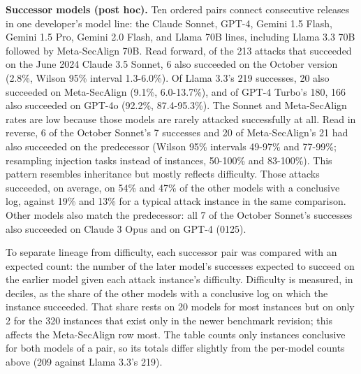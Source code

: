 \documentclass[
  american,
  10pt,
  a4paper,
]{article}
\begin{document}
\textbf{Successor models (post hoc).} Ten ordered pairs connect
consecutive releases in one developer's model line: the Claude Sonnet,
GPT-4, Gemini 1.5 Flash, Gemini 1.5 Pro, Gemini 2.0 Flash, and Llama 70B
lines, including Llama 3.3 70B followed by Meta-SecAlign 70B. Read
forward, of the 213 attacks that succeeded on the June 2024 Claude 3.5
Sonnet, 6 also succeeded on the October version (2.8\%, Wilson 95\%
interval 1.3-6.0\%). Of Llama 3.3's 219 successes, 20 also succeeded on
Meta-SecAlign (9.1\%, 6.0-13.7\%), and of GPT-4 Turbo's 180, 166 also
succeeded on GPT-4o (92.2\%, 87.4-95.3\%). The Sonnet and Meta-SecAlign
rates are low because those models are rarely attacked successfully at
all. Read in reverse, 6 of the October Sonnet's 7 successes and 20 of
Meta-SecAlign's 21 had also succeeded on the predecessor (Wilson 95\%
intervals 49-97\% and 77-99\%; resampling injection tasks instead of
instances, 50-100\% and 83-100\%). This pattern resembles inheritance
but mostly reflects difficulty. Those attacks succeeded, on average, on
54\% and 47\% of the other models with a conclusive log, against 19\%
and 13\% for a typical attack instance in the same comparison. Other
models also match the predecessor: all 7 of the October Sonnet's
successes also succeeded on Claude 3 Opus and on GPT-4 (0125).

To separate lineage from difficulty, each successor pair was compared
with an expected count: the number of the later model's successes
expected to succeed on the earlier model given each attack instance's
difficulty. Difficulty is measured, in deciles, as the share of the
other models with a conclusive log on which the instance succeeded. That
share rests on 20 models for most instances but on only 2 for the 320
instances that exist only in the newer benchmark revision; this affects
the Meta-SecAlign row most. The table counts only instances conclusive
for both models of a pair, so its totals differ slightly from the
per-model counts above (209 against Llama 3.3's 219).
\end{document}

